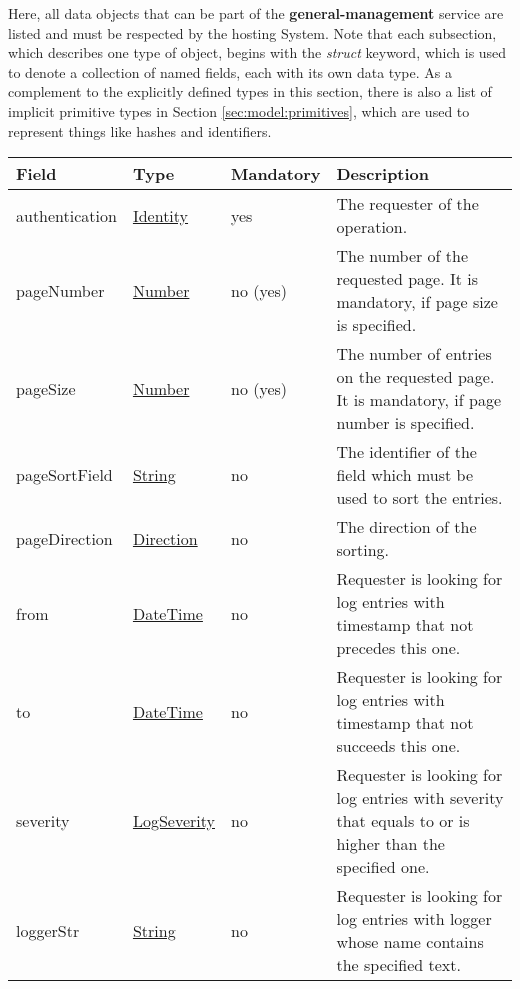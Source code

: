 \documentclass[a4paper]{arrowhead}
\newcommand{\pref}[1]{{\textcolor{ArrowheadGrey}{\hyperref[sec:model:primitives:#1]{#1}}}}
\begin{document}
Here, all data objects that can be part of the \textbf{general-management} service
are listed and must be respected by the hosting System.
Note that each subsection, which describes one type of object, begins with the \textit{struct} keyword, which is used to denote a collection of named fields, each with its own data type.
As a complement to the explicitly defined types in this section, there is also a list of implicit primitive types in Section \ref{sec:model:primitives}, which are used to represent things like hashes and identifiers.

{}
 
\begin{table}[ht!]
\begin{tabularx}{\textwidth}{| p{2.5cm} | p{2.5cm} | p{2cm} | X |} \hline
\rowcolor{gray!33} Field & Type & Mandatory & Description \\ \hline
authentication & \hyperref[sec:model:Identity]{Identity} & yes & The requester of the operation. \\ \hline
pageNumber & \pref{Number} & no (yes) & The number of the requested page. It is mandatory, if page size is specified. \\ \hline
pageSize & \pref{Number} & no (yes) & The number of entries on the requested page. It is mandatory, if page number is specified. \\ \hline
pageSortField & \pref{String} & no & The identifier of the field which must be used to sort the entries. \\ \hline
pageDirection & \pref{Direction} & no & The direction of the sorting. \\ \hline
from & \pref{DateTime} & no & Requester is looking for log entries with timestamp that not precedes this one. \\ \hline
to & \pref{DateTime} & no & Requester is looking for log entries with timestamp that not succeeds this one. \\ \hline
severity & \pref{LogSeverity} & no & Requester is looking for log entries with severity that equals to or is higher than the specified one. \\ \hline
loggerStr &  \pref{String} & no & Requester is looking for log entries with logger whose name contains the specified text. \\ \hline
\end{tabularx}
\end{table}

\end{document}
